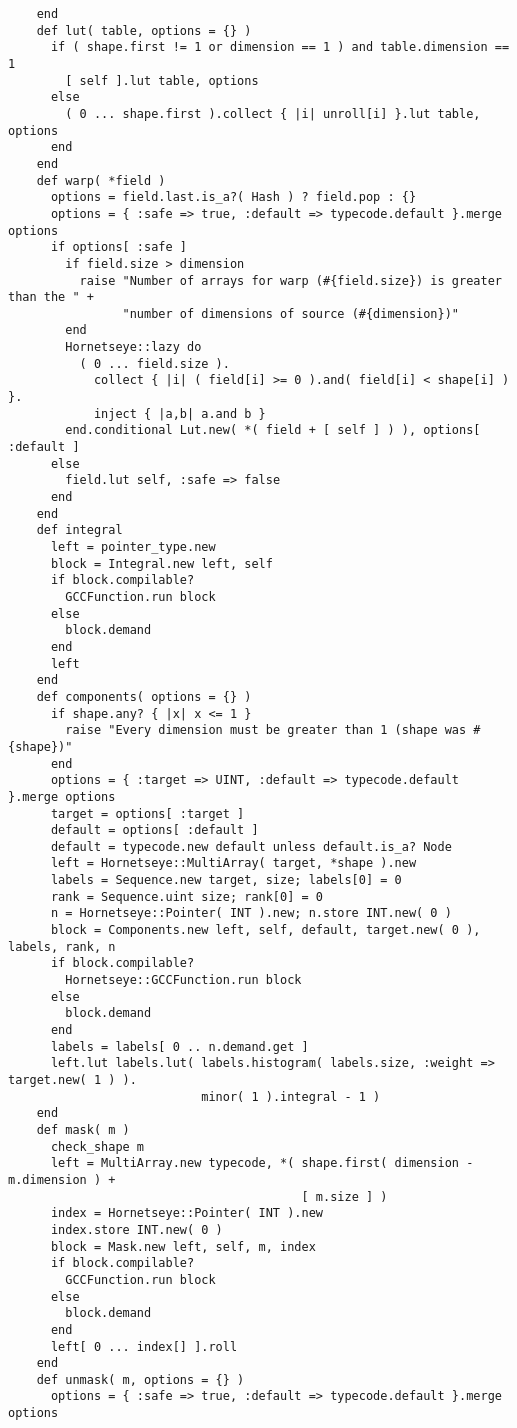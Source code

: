 \begin{lstlisting}
    end
    def lut( table, options = {} )
      if ( shape.first != 1 or dimension == 1 ) and table.dimension == 1
        [ self ].lut table, options
      else
        ( 0 ... shape.first ).collect { |i| unroll[i] }.lut table, options
      end
    end
    def warp( *field )
      options = field.last.is_a?( Hash ) ? field.pop : {}
      options = { :safe => true, :default => typecode.default }.merge options
      if options[ :safe ]
        if field.size > dimension
          raise "Number of arrays for warp (#{field.size}) is greater than the " +
                "number of dimensions of source (#{dimension})"
        end
        Hornetseye::lazy do
          ( 0 ... field.size ).
            collect { |i| ( field[i] >= 0 ).and( field[i] < shape[i] ) }.
            inject { |a,b| a.and b }
        end.conditional Lut.new( *( field + [ self ] ) ), options[ :default ]
      else
        field.lut self, :safe => false
      end
    end
    def integral
      left = pointer_type.new
      block = Integral.new left, self
      if block.compilable?
        GCCFunction.run block
      else
        block.demand
      end
      left
    end
    def components( options = {} )
      if shape.any? { |x| x <= 1 }
        raise "Every dimension must be greater than 1 (shape was #{shape})"
      end
      options = { :target => UINT, :default => typecode.default }.merge options
      target = options[ :target ]
      default = options[ :default ]
      default = typecode.new default unless default.is_a? Node
      left = Hornetseye::MultiArray( target, *shape ).new
      labels = Sequence.new target, size; labels[0] = 0
      rank = Sequence.uint size; rank[0] = 0
      n = Hornetseye::Pointer( INT ).new; n.store INT.new( 0 )
      block = Components.new left, self, default, target.new( 0 ), labels, rank, n
      if block.compilable?
        Hornetseye::GCCFunction.run block
      else
        block.demand
      end
      labels = labels[ 0 .. n.demand.get ]
      left.lut labels.lut( labels.histogram( labels.size, :weight => target.new( 1 ) ).
                           minor( 1 ).integral - 1 )
    end
    def mask( m )
      check_shape m
      left = MultiArray.new typecode, *( shape.first( dimension - m.dimension ) +
                                         [ m.size ] )
      index = Hornetseye::Pointer( INT ).new
      index.store INT.new( 0 )
      block = Mask.new left, self, m, index
      if block.compilable?
        GCCFunction.run block
      else
        block.demand
      end
      left[ 0 ... index[] ].roll
    end
    def unmask( m, options = {} )
      options = { :safe => true, :default => typecode.default }.merge options

\end{lstlisting}
